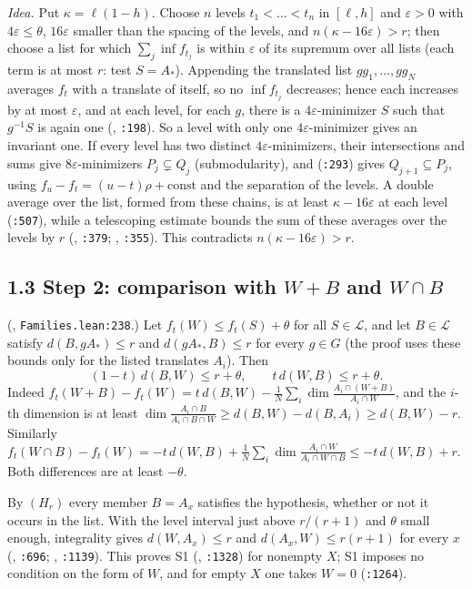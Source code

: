 \documentclass[11pt]{amsart}
\newcommand{\Lc}{\mathcal{L}}
\begin{document}
\emph{Idea.} Put $\kappa=\ell(1-h)$. Choose $n$ levels $t_1<\dots<t_n$ in $[\ell,h]$ and $\varepsilon>0$ with
$4\varepsilon\le\theta$, $16\varepsilon$ smaller than the spacing of the levels, and $n(\kappa-16\varepsilon)>r$; then
choose a list for which $\sum_j\inf f_{t_j}$ is within $\varepsilon$ of its supremum over all lists (each term is at most
$r$: test $S=A_*$). Appending the translated list $gg_1,\dots,gg_N$ averages $f_t$ with a translate of itself, so no
$\inf f_{t_j}$ decreases; hence each increases by at most $\varepsilon$, and at each level, for each $g$, there is a
$4\varepsilon$-minimizer $S$ such that $g^{-1}S$ is again one (, \texttt{:198}). So a level with only one
$4\varepsilon$-minimizer gives an invariant one. If every level has two distinct $4\varepsilon$-minimizers, their
intersections and sums give $8\varepsilon$-minimizers $P_j\subsetneq Q_j$ (submodularity), and 
(\texttt{:293}) gives $Q_{j+1}\subseteq P_j$, using $f_u-f_t=(u-t)\rho+\mathrm{const}$ and the separation of the levels.
A double average over the list, formed from these chains, is at least $\kappa-16\varepsilon$ at each level
(\texttt{:507}), while a telescoping estimate bounds the sum of these averages over the levels by $r$ (,
\texttt{:379}; , \texttt{:355}). This contradicts $n(\kappa-16\varepsilon)>r$.

\subsection*{1.3 Step 2: comparison with $W+B$ and $W\cap B$}
(, \texttt{Families.lean:238}.) Let $f_t(W)\le f_t(S)+\theta$ for all $S\in\Lc$, and let
$B\in\Lc$ satisfy $d(B,gA_*)\le r$ and $d(gA_*,B)\le r$ for every $g\in G$ (the proof uses these bounds only for the listed
translates $A_i$). Then
\begin{equation}\label{fo}
(1-t)\,d(B,W)\le r+\theta,\qquad t\,d(W,B)\le r+\theta .\tag{1.2}
\end{equation}
Indeed $f_t(W+B)-f_t(W)=t\,d(B,W)-\frac1N\sum_i\dim\frac{A_i\cap(W+B)}{A_i\cap W}$, and the $i$-th dimension is at
least $\dim\frac{A_i\cap B}{A_i\cap B\cap W}\ge d(B,W)-d(B,A_i)\ge d(B,W)-r$. Similarly
$f_t(W\cap B)-f_t(W)=-t\,d(W,B)+\frac1N\sum_i\dim\frac{A_i\cap W}{A_i\cap W\cap B}\le -t\,d(W,B)+r$. Both differences
are at least $-\theta$.

By $(H_r)$ every member $B=A_x$ satisfies the hypothesis, whether or not it occurs in the list. With the level interval
just above $r/(r+1)$ and $\theta$ small enough, integrality gives $d(W,A_x)\le r$ and $d(A_x,W)\le r(r+1)$ for every $x$
(, \texttt{:696}; , \texttt{:1139}). This proves S1
(, \texttt{:1328}) for nonempty $X$; S1 imposes no condition on the form of $W$, and
for empty $X$ one takes $W=0$ (\texttt{:1264}).
\end{document}
